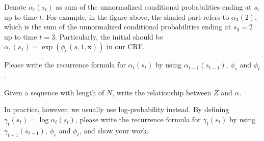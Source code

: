 \documentclass[11pt, letterpaper]{article}
\begin{document}
\begin{enumerate}[label=(\alph*)]
        Denote $\alpha_t(s_t)$ as sum of the unnormalized conditional probabilities ending at $s_t$ up to time $t$. For example, in the figure above, the shaded part refers to $\alpha_3(2)$, which is the sum of the unnormalized conditional probabilities ending at $s_3 = 2$ up to time $t = 3$. Particularly, the initial should be $\alpha_1(s_1) = \exp(\phi_e(s, 1, \mathbf{x}))$ in our CRF.

        Please write the recurrence formula for $\alpha_t(s_t)$ by using $\alpha_{t-1}(s_{t-1})$, $\phi_e$ and $\phi_t$.
        
        Given a sequence with length of $N$, write the relationship between $Z$ and $\alpha$.
        
        In practice, however, we usually use log-probability instead. By defining $\gamma_t(s_t) = \log \alpha_t(s_t)$, please write the recurrence formula for $\gamma_t(s_t)$ by using $\gamma_{t-1}(s_{t-1})$, $\phi_e$ and $\phi_t$, and show your work.
        
        \end{enumerate}
\end{document}
